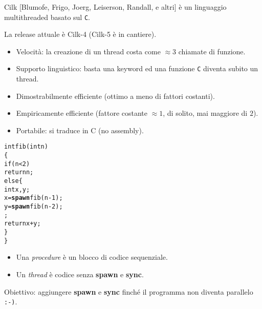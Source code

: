 \documentclass[times,sans-serif]{athenaslides}
\newcommand{\cilkkw}[1]{{\bf #1}}
\begin{document}
\begin{slide}[Cilk]
  \smaller
  Cilk [Blumofe, Frigo, Joerg, Leiserson, Randall, e altri]
  \`e un linguaggio multithreaded basato sul \texttt{C}.
  
  La release attuale \`e Cilk-4 (Cilk-5 \`e in cantiere).

  \begin{itemize}
  \item Velocit\`a: la creazione di un thread costa come $\approx 3$
    chiamate di funzione.
  \item Supporto linguistico: basta una keyword ed una funzione 
    \texttt{C} diventa subito un thread.
  \item Dimostrabilmente efficiente (ottimo a meno di fattori costanti).
  \item Empiricamente efficiente (fattore costante $\approx 1$, di solito,
    mai maggiore di $2$).
  \item Portabile: si traduce in C (no assembly).
  \end{itemize}
\end{slide}
\begin{slide}
  \begin{minipage}{.6\linewidth}\smaller
    \begin{alltt}
\Black{}\cilkkw{cilk} int fib(int n)
\{
     \Blue{}if (n < 2)
          return n;
     else \{
          int x, y;
          x = \cilkkw{spawn} fib(n - 1);
          \Red{}y = \cilkkw{spawn} fib(n - 2);
          \Black{}\cilkkw{sync};
          \Green{}return x + y;
     \Black{}\}
\}
\end{alltt}
\end{minipage}
\hfill
\begin{minipage}{.4\linewidth}\raggedright\restoresize
  \begin{itemize}
  \item Una \emph{\Red procedure} \`e un blocco di codice sequenziale.
  \item Un \emph{\Red thread} \`e codice senza \cilkkw{spawn}
    e \cilkkw{sync}.
  \end{itemize}
\end{minipage}
\bigskip
{\Red Obiettivo:} aggiungere \cilkkw{spawn} e \cilkkw{sync} finch\'e il
programma non diventa parallelo \texttt{:-)}.
\end{slide}
\end{document}
